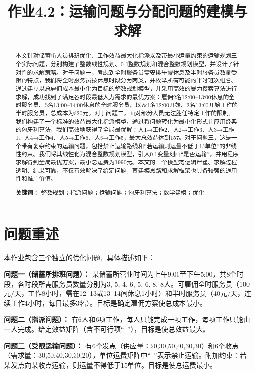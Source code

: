 \documentclass[12pt]{ctexart}
\title{作业4.2：运输问题与分配问题的建模与求解}
\author{}
\date{}
\begin{document}
\maketitle

\begin{abstract}
    本文针对储蓄所人员排班优化、工作效益最大化指派以及带最小运量约束的运输规划三个实际问题，分别构建了整数线性规划、0-1整数规划和混合整数规划模型，并设计了针对性的求解策略。对于问题一，考虑到全时服务员需安排午餐休息及半时服务员数量受限的特点，我们将全时服务员按休息时段分为两类，并枚举所有可能的半时班次组合。通过建立以总雇佣成本最小化为目标的整数规划模型，并采用高效的暴力搜索算法进行求解，成功找到了满足各时段最低人力需求的最优方案：雇佣2名12:00–13:00休息的全时服务员、5名13:00–14:00休息的全时服务员，以及1名12:00开始、2名13:00开始工作的半时服务员，总成本为820元。对于问题二，面对部分人员无法胜任特定工作的限制，我们构建了一个标准的效益最大化指派模型。通过将问题转化为最小化形式并应用经典的匈牙利算法，我们高效地获得了全局最优解：人1→工作2、人2→工作3、人3→工作1、人4→工作4、人5→工作6、人6→工作5，最大总效益达到157。对于问题三，这是一个带有复杂约束的运输问题，包括禁止运输路线和“若运输则运量不低于15单位”的非线性约束。我们将其线性化为混合整数规划模型，引入0-1变量刻画“是否运输”，并用程序求解得到全局最优方案，最小总运费为1990元。本文的三个模型均逻辑严谨、求解过程透明、结果可靠，不仅有效解决了给定问题，其建模思路和求解框架也具备较强的通用性和推广价值。
    
    \noindent\textbf{关键词：} 整数规划；指派问题；运输问题；匈牙利算法；数学建模；优化
\end{abstract}

\section{问题重述}
本作业包含三个独立的优化问题，具体描述如下：

\textbf{问题一（储蓄所排班问题）：} 某储蓄所营业时间为上午9:00至下午5:00，共8个时段，各时段所需服务员数量分别为3, 5, 4, 6, 5, 6, 8, 8人。可雇佣全时服务员（100元/天，工作8小时，需在12–13或13–14间休息1小时）和半时服务员（40元/天，连续工作4小时，每日最多3名）。目标是确定雇佣方案使总成本最小。

\textbf{问题二（指派问题）：} 有6人和6项工作，每人只能完成一项工作，每项工作只能由一人完成。给定效益矩阵（含不可行项“–”），目标是使总效益最大。

\textbf{问题三（受限运输问题）：} 有6个发点（供应量：20,30,50,40,30,30）和6个收点（需求量：30,50,40,30,30,20），单位运费矩阵中“–”表示禁止运输。附加约束：若某发点向某收点运输，则运量不得低于15单位。目标是使总运费最小。
\end{document}
